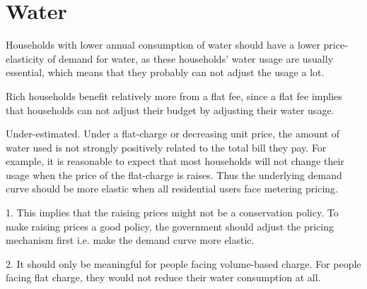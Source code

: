\documentclass[a4paper]{article}
\begin{document}
    \section{Water}
    \begin{answer}[Q1]
    Households with lower annual consumption of water should have a lower price-elasticity of demand for water, as these households' water usage are usually essential, which means that they probably can not adjust the usage a lot.
    \end{answer}
    \begin{answer}[Q2]
    Rich households benefit relatively more from a flat fee, since a flat fee implies that households can not adjust their budget by adjusting their water usage.
    \end{answer}
    \begin{answer}[Q3]
    Under-estimated. Under a flat-charge or decreasing unit price, the amount of water used is not strongly positively related to the total bill they pay. For example, it is reasonable to expect that most households will not change their usage when the price of the flat-charge is raises. Thus the underlying demand curve should be more elastic when all residential users face metering pricing.
    \end{answer}
    \begin{answer}[Q4]
    1. This implies that the raising prices might not be a conservation policy. To make raising prices a good policy, the government should adjust the pricing mechanism first i.e. make the demand curve more elastic.
    
    2. It should only be meaningful for people facing volume-based charge. For people facing flat charge, they would not reduce their water consumption at all.
    \end{answer}
    
\end{document}

